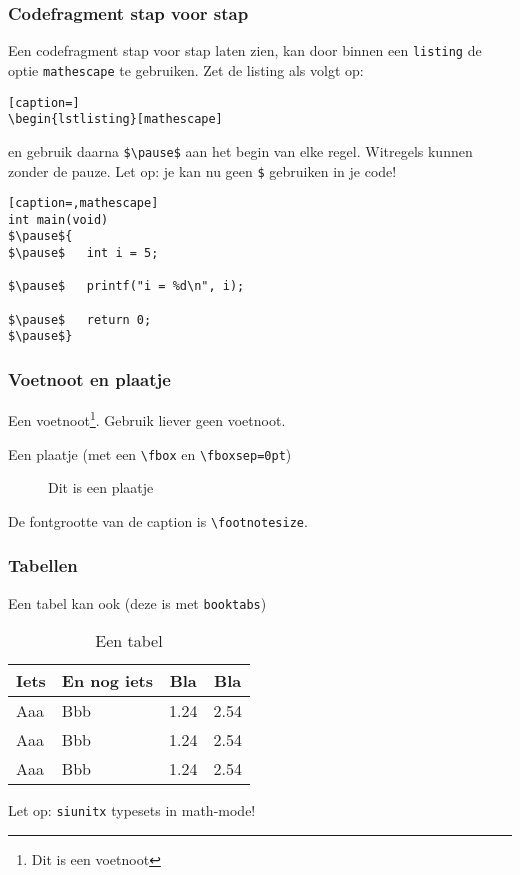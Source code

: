 \documentclass[fleqn,aspectratio=169,dutch,10pt]{beamer}
\begin{document}
\begin{frame}[fragile]
\frametitle{Codefragment stap voor stap}
Een codefragment stap voor stap laten zien, kan door binnen een \lstinline|listing| de optie \lstinline|mathescape| te gebruiken. Zet de listing als volgt op:
\begin{lstlisting}[caption=]
\begin{lstlisting}[mathescape]
\end{lstlisting}
en gebruik daarna \lstinline|$\pause$| aan het begin van elke regel. Witregels kunnen zonder de pauze. Let op: je kan nu geen \lstinline|$| gebruiken in je code!
\begin{lstlisting}[caption=,mathescape]
int main(void)
$\pause${
$\pause$   int i = 5;

$\pause$   printf("i = %d\n", i);

$\pause$   return 0;
$\pause$}
\end{lstlisting}
\end{frame}


\begin{frame}[fragile]
\frametitle{Voetnoot en plaatje}
Een voetnoot\footnote{Dit is een voetnoot}. Gebruik liever geen voetnoot.

Een plaatje (met een \lstinline|\fbox| en \lstinline|\fboxsep=0pt|)

\begin{figure}
\fboxsep=0pt
\fbox{\resizebox{0.30\paperwidth}{!}{\beamerthemethuaslogo}}
\caption{Dit is een plaatje}
\end{figure}

De fontgrootte van de caption is \lstinline|\footnotesize|.

\end{frame}


\begin{frame}
\frametitle{Tabellen}
Een tabel kan ook (deze is met \texttt{booktabs})

\begin{table}[!ht]
\caption{Een tabel}
\begin{tabular}{llcc}
\toprule
Iets & En nog iets & Bla & Bla \\
\midrule
Aaa & Bbb & 1.24 & 2.54 \\
Aaa & Bbb & 1.24 & 2.54 \\
Aaa & Bbb & 1.24 & 2.54 \\
\bottomrule
\end{tabular}
\end{table}

Let op: \texttt{siunitx} typesets in math-mode!
\end{frame}
\end{document}
